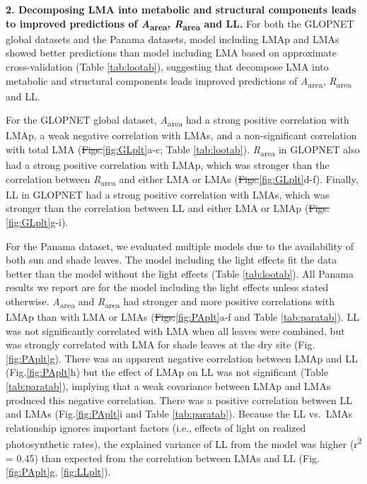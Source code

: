 \documentclass[
  12pt,
]{article}
\providecommand{\DIFaddtex}[1]{{\protect\color{blue}\uwave{#1}}} %
\providecommand{\DIFdeltex}[1]{{\protect\color{red}\sout{#1}}}                      %
\providecommand{\DIFaddbegin}{} %
\providecommand{\DIFaddend}{} %
\providecommand{\DIFdelbegin}{} %
\providecommand{\DIFdelend}{} %
\providecommand{\DIFadd}[1]{\texorpdfstring{\DIFaddtex{#1}}{#1}} %
\providecommand{\DIFdel}[1]{\texorpdfstring{\DIFdeltex{#1}}{}} %
\newcommand{\DIFscaledelfig}{0.5}
\newlength{\DIFdelgraphicswidth} %
\newlength{\DIFdelgraphicsheight} %
\newcommand{\DIFaddincludegraphics}[2][]{{\color{blue}\fbox{\DIFOincludegraphics[#1]{#2}}}} %
\newcommand{\DIFdelincludegraphics}[2][]{%
\sbox{\DIFdelgraphicsbox}{\DIFOincludegraphics[#1]{#2}}%
\settoboxwidth{\DIFdelgraphicswidth}{\DIFdelgraphicsbox} %
\settoboxtotalheight{\DIFdelgraphicsheight}{\DIFdelgraphicsbox} %
\scalebox{\DIFscaledelfig}{%
\parbox[b]{\DIFdelgraphicswidth}{\usebox{\DIFdelgraphicsbox}\\[-\baselineskip] \rule{\DIFdelgraphicswidth}{0em}}\llap{\resizebox{\DIFdelgraphicswidth}{\DIFdelgraphicsheight}{%
\setlength{\unitlength}{\DIFdelgraphicswidth}%
\begin{picture}(1,1)%
\thicklines\linethickness{2pt} %
{\color[rgb]{1,0,0}\put(0,0){\framebox(1,1){}}}%
{\color[rgb]{1,0,0}\put(0,0){\line( 1,1){1}}}%
{\color[rgb]{1,0,0}\put(0,1){\line(1,-1){1}}}%
\end{picture}%
}\hspace*{3pt}}} %
} %
\DeclareRobustCommand{\DIFaddbegin}{\DIFOaddbegin \let\includegraphics\DIFaddincludegraphics} %
\DeclareRobustCommand{\DIFaddend}{\DIFOaddend \let\includegraphics\DIFOincludegraphics} %
\DeclareRobustCommand{\DIFdelbegin}{\DIFOdelbegin \let\includegraphics\DIFdelincludegraphics} %
\DeclareRobustCommand{\DIFdelend}{\DIFOaddend \let\includegraphics\DIFOincludegraphics} %
\begin{document}
\textbf{2. Decomposing LMA into metabolic and structural components leads to improved predictions of \emph{A}\textsubscript{area}, \emph{R}\textsubscript{area} and LL.}
For both the GLOPNET global datasets and the Panama datasets, model including LMAp and LMAs showed better predictions than model including LMA based on approximate cross-validation (Table \ref{tab:lootab}), suggesting that decompose LMA into metabolic and structural components leads improved predictions of \emph{A}\textsubscript{area}, \emph{R}\textsubscript{area} and LL.

For the GLOPNET global dataset, \emph{A}\textsubscript{area} had a strong positive correlation with LMAp, a weak negative correlation with LMAs, and a non-significant correlation with total LMA (\DIFdelbegin \DIFdel{Figs.}\DIFdelend \DIFaddbegin \DIFadd{Fig.~}\DIFaddend \ref{fig:GLplt}a-c; Table \ref{tab:lootab}).
\emph{R}\textsubscript{area} in GLOPNET also had a strong positive correlation with LMAp, which was stronger than the correlation between \emph{R}\textsubscript{area} and either LMA or LMAs (\DIFdelbegin \DIFdel{Figs.}\DIFdelend \DIFaddbegin \DIFadd{Fig.~}\DIFaddend \ref{fig:GLplt}d-f).
Finally, LL in GLOPNET had a strong positive correlation with LMAs, which was stronger than the correlation between LL and either LMA or LMAp (\DIFdelbegin \DIFdel{Figs.}\DIFdelend \DIFaddbegin \DIFadd{Fig.~}\DIFaddend \ref{fig:GLplt}g-i).

For the Panama dataset, we evaluated multiple models due to the availability of both sun and shade leaves.
The model including the light effects fit the data better than the model without the light effects (Table \ref{tab:lootab}).
All Panama results we report are for the model including the light effects unless stated otherwise.
\emph{A}\textsubscript{area} and \emph{R}\textsubscript{area} had stronger and more positive correlations with LMAp than with LMA or LMAs (\DIFdelbegin \DIFdel{Figs.}\DIFdelend \DIFaddbegin \DIFadd{Fig.~}\DIFaddend \ref{fig:PAplt}a-f and Table \ref{tab:paratab}).
LL was not significantly correlated with LMA when all leaves were combined, but was strongly correlated with LMA for shade leaves at the dry site (Fig.\DIFaddbegin \DIFadd{~}\DIFaddend \ref{fig:PAplt}g).
There was an apparent negative correlation between LMAp and LL (Fig.\DIFaddbegin \DIFadd{~}\DIFaddend \ref{fig:PAplt}h) but the effect of LMAp on LL was not significant (Table \ref{tab:paratab}), implying that a weak covariance between LMAp and LMAs produced this negative correlation.
There was a positive correlation between LL and LMAs (Fig.\DIFaddbegin \DIFadd{~}\DIFaddend \ref{fig:PAplt}i and Table \ref{tab:paratab}).
Because the LL vs.~LMAs relationship ignores important factors (i.e., effects of light on realized photosynthetic rates), the explained variance of LL from the model was higher (r\textsuperscript{2} = 0.45) than expected from the correlation between LMAs and LL (Fig.\DIFaddbegin \DIFadd{~}\DIFaddend \ref{fig:PAplt}g, \DIFaddbegin \DIFadd{Fig.~}\DIFaddend \ref{fig:LLplt}).
\end{document}
